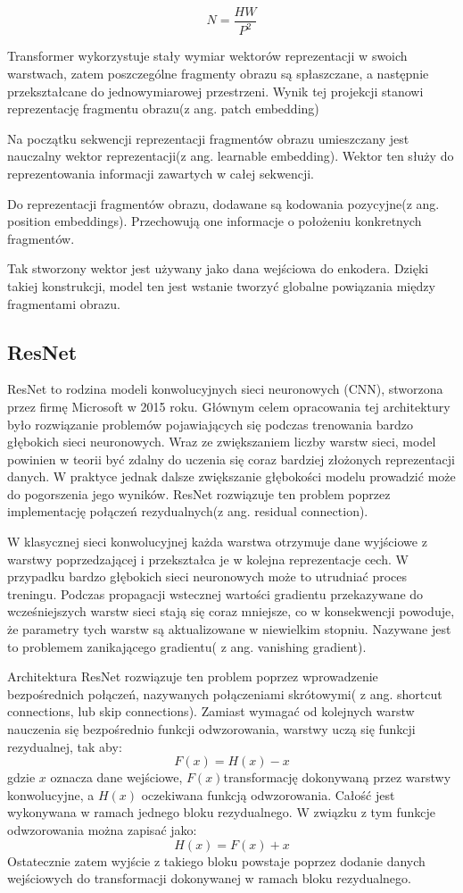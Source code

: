 $$ N= \frac{HW}{P^2}$$ 

Transformer wykorzystuje stały wymiar wektorów reprezentacji w swoich warstwach, zatem poszczególne fragmenty obrazu są spłaszczane, a następnie przekształcane do jednowymiarowej przestrzeni. Wynik tej projekcji stanowi reprezentację fragmentu obrazu(z ang. patch embedding)

Na początku sekwencji reprezentacji fragmentów obrazu umieszczany jest nauczalny wektor reprezentacji(z ang. learnable embedding). Wektor ten służy do reprezentowania informacji zawartych w całej sekwencji.

Do reprezentacji fragmentów obrazu, dodawane są kodowania pozycyjne(z ang. position embeddings). Przechowują one informacje o położeniu konkretnych fragmentów.

Tak stworzony wektor jest używany jako dana wejściowa do enkodera. Dzięki takiej konstrukcji, model ten jest wstanie tworzyć globalne powiązania między fragmentami obrazu.\cite{dosovitskiy2020image}

\subsection{ResNet}
ResNet to rodzina modeli konwolucyjnych sieci neuronowych (CNN), stworzona przez firmę Microsoft w 2015 roku. Głównym celem opracowania tej architektury było rozwiązanie problemów pojawiających się podczas trenowania bardzo głębokich sieci neuronowych. Wraz ze zwiększaniem liczby warstw sieci, model powinien w teorii być zdalny do uczenia się coraz bardziej złożonych reprezentacji danych. W praktyce jednak dalsze zwiększanie głębokości modelu prowadzić może do pogorszenia jego wyników. ResNet rozwiązuje ten problem poprzez implementację połączeń rezydualnych(z ang. residual connection).

W klasycznej sieci konwolucyjnej każda warstwa otrzymuje dane wyjściowe z warstwy poprzedzającej i przekształca je w kolejna reprezentacje cech. W przypadku bardzo głębokich sieci neuronowych może to utrudniać proces treningu.  Podczas propagacji wstecznej wartości gradientu przekazywane do wcześniejszych warstw sieci stają się coraz  mniejsze, co w konsekwencji powoduje, że parametry tych warstw są aktualizowane w niewielkim stopniu. Nazywane jest to problemem zanikającego gradientu( z ang. vanishing gradient). 

Architektura ResNet rozwiązuje ten problem poprzez wprowadzenie bezpośrednich połączeń, nazywanych połączeniami skrótowymi( z ang. shortcut connections, lub skip connections). Zamiast wymagać od kolejnych warstw nauczenia się bezpośrednio funkcji odwzorowania, warstwy uczą się funkcji rezydualnej, tak aby:
$$ F(x) = H(x) - x $$
gdzie $x$ oznacza dane wejściowe, $F(x) $transformację dokonywaną przez warstwy konwolucyjne, a $H(x)$ oczekiwana funkcją odwzorowania. Całość jest wykonywana w ramach jednego bloku rezydualnego. W związku z tym funkcje odwzorowania można zapisać jako:
$$ H(x) = F(x) + x $$
 Ostatecznie zatem wyjście z takiego bloku powstaje poprzez dodanie danych wejściowych do transformacji dokonywanej w ramach bloku rezydualnego. 


